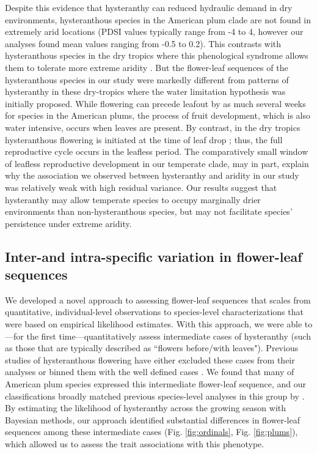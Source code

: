 \documentclass{article}[12pt]
\begin{document}
Despite this evidence that hysteranthy can reduced hydraulic demand in dry environments, hysteranthous species in the American plum clade are not found in extremely arid locations (PDSI values typically range from -4 to 4, however our analyses found mean values ranging from -0.5 to 0.2). This contrasts with hysteranthous species in the dry tropics where this phenological syndrome allows them to tolerate more extreme aridity \citep{Franklin2016}. But the flower-leaf sequences of the hysteranthous species in our study were markedly different from patterns of hysteranthy in these dry-tropics where the water limitation hypothesis was initially proposed. While flowering can precede leafout by as much several weeks for species in the American plums, the process of fruit development, which is also water intensive, occurs when leaves are present. By contrast, in the dry tropics hysteranthous flowering is initiated at the time of leaf drop \citep{Borchert1983,Franklin2016}; thus, the full reproductive cycle occurs in the leafless period. The comparatively small window of leafless reproductive development in our temperate clade, may in part, explain why the association we observed between hysteranthy and aridity in our study was relatively weak with high residual variance. Our results suggest that hysteranthy may allow temperate species to occupy marginally drier environments than non-hysteranthous species, but may not facilitate species' persistence under extreme aridity. 

\subsection*{Inter-and intra-specific variation in flower-leaf sequences} %
We developed a novel approach to assessing flower-leaf sequences that scales from quantitative, individual-level observations to species-level characterizations that were based on empirical likelihood estimates. With this approach, we were able to---for the first time---quantitatively assess intermediate cases of hysteranthy (such as those that are typically described as ``flowers before/with leaves"). Previous studies of hysteranthous flowering have either excluded these cases from their analyses  \citep[e.g.;][]{Gougherty2018} or binned them with the well defined cases \citep[e.g.;][]{Buonaiuto2020}. We found that many of American plum species expressed this intermediate flower-leaf sequence, and our classifications broadly matched previous species-level analyses in this group by \citet{Shaw:2004aa}. By estimating the likelihood of hysteranthy across the growing season with Bayesian methods, our approach identified substantial differences in flower-leaf sequences among these intermediate cases (Fig. \ref{fig:ordinals}, Fig. \ref{fig:plums}), which allowed us to assess the trait associations with this phenotype.
\end{document}
